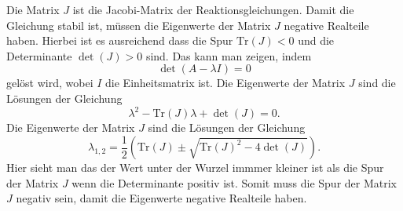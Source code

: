 Die Matrix \(J\) ist die Jacobi-Matrix der Reaktionsgleichungen.
Damit die Gleichung stabil ist, müssen die Eigenwerte der Matrix \(J\) negative Realteile haben.
Hierbei ist es ausreichend dass die Spur \(\text{Tr}(J) < 0\) und die Determinante \(\det(J) > 0\) sind.
Das kann man zeigen, indem
\begin{equation}
    \det(A - \lambda I) = 0
\end{equation}
gelöst wird, wobei \(I\) die Einheitsmatrix ist.
Die Eigenwerte der Matrix \(J\) sind die Lösungen der Gleichung
\begin{equation}
    \lambda^2 - \text{Tr}(J) \lambda + \det(J) = 0.
\label{reaktdiff:equation:reaktdiff2ohneDifflinearisiert3}
\end{equation}
Die Eigenwerte der Matrix \(J\) sind die Lösungen der Gleichung
\begin{equation}
    \lambda_{1,2} = \frac{1}{2} \left( \text{Tr}(J) \pm 
    \sqrt{\text{Tr}(J)^2 - 4 \det(J)} \right).
\label{reaktdiff:equation:reaktdiff2ohneDifflinearisiert4}
\end{equation}
Hier sieht man das der Wert unter der Wurzel immmer kleiner ist als die Spur der Matrix \(J\) wenn die Determinante positiv ist.
Somit muss die Spur der Matrix \(J\) negativ sein, damit die Eigenwerte negative Realteile haben.

